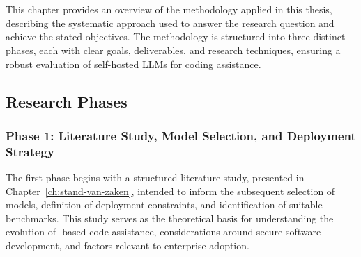 \chapter{}%
\label{ch:methodologie}


This chapter provides an overview of the methodology applied in this thesis, describing the systematic approach used to answer the research question and achieve the stated objectives. The methodology is structured into three distinct phases, each with clear goals, deliverables, and research techniques, ensuring a robust evaluation of self-hosted \glspl{LLM} for coding assistance.
\section{Research Phases}
\label{sec:research-phases}

\subsection{Phase 1: Literature Study, Model Selection, and Deployment Strategy}

The first phase begins with a structured literature study, presented in Chapter~\ref{ch:stand-van-zaken}, intended to inform the subsequent selection of models, definition of deployment constraints, and identification of suitable benchmarks. This study serves as the theoretical basis for understanding the evolution of -based code assistance, considerations around secure software development, and factors relevant to enterprise adoption.

